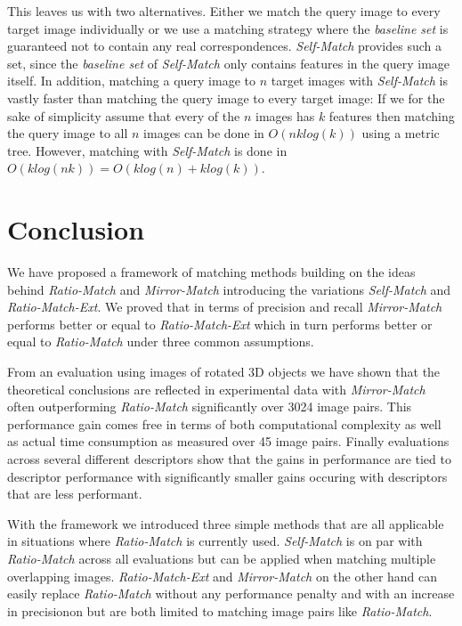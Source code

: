\documentclass[journal]{IEEEtran}
\begin{document}
This leaves us with two alternatives. Either we match the query image to 
every target image individually or we use a matching strategy where the 
\emph{baseline set} is guaranteed not to contain any real 
correspondences. \emph{Self-Match} provides such a set, since the 
\emph{baseline set} of \emph{Self-Match} only contains features in the 
query image itself. In addition, matching a query image to $n$ target 
images with \emph{Self-Match} is vastly faster than matching the query 
image to every target image: If we for the sake of simplicity assume 
that every of the $n$ images has $k$ features then matching the query 
image to all $n$ images can be done in $O(nklog(k))$ using a metric 
tree. However, matching with \emph{Self-Match} is done in $O(klog(nk)) =
O(klog(n) + klog(k))$.

\section{Conclusion}
\label{S:Summary}

We have proposed a framework of matching methods building on the ideas 
behind \emph{Ratio-Match} and \emph{Mirror-Match} introducing the 
variations \emph{Self-Match} and \emph{Ratio-Match-Ext}. We proved that 
in terms of precision and recall \emph{Mirror-Match} performs better or 
equal to \emph{Ratio-Match-Ext} which in turn performs better or equal 
to \emph{Ratio-Match} under three common assumptions.

From an evaluation using images of rotated 3D objects we have shown that
the theoretical conclusions are reflected in experimental data with 
\emph{Mirror-Match} often outperforming \emph{Ratio-Match}
significantly over 3024 image pairs. This performance gain comes free in 
terms of both computational complexity as well as actual time 
consumption as measured over 45 image pairs. Finally evaluations across 
several different descriptors show that the gains in performance are 
tied to descriptor performance with significantly smaller gains occuring 
with descriptors that are less performant.

With the framework we introduced three simple methods that are all 
applicable in situations where \emph{Ratio-Match} is currently used.  
\emph{Self-Match} is on par with \emph{Ratio-Match} across all 
evaluations but can be applied when matching multiple overlapping 
images. \emph{Ratio-Match-Ext} and \emph{Mirror-Match} on the other hand 
can easily replace \emph{Ratio-Match} without any performance penalty 
and with an increase in precisionon but are both limited to matching 
image pairs like \emph{Ratio-Match}.



\end{document}
